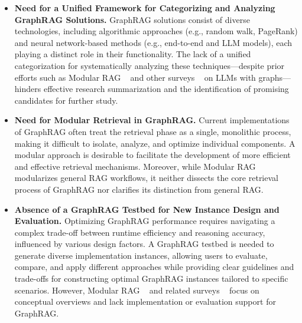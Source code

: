 \begin{itemize}  [leftmargin=12pt]
\item 
\textbf{Need for a Unified Framework for Categorizing and Analyzing GraphRAG Solutions.}
GraphRAG solutions consist of diverse technologies, including algorithmic approaches (e.g., random walk, PageRank) and neural network-based methods (e.g., end-to-end and LLM models), each playing a distinct role in their functionality. The lack of a unified categorization for systematically analyzing these techniques—despite prior efforts such as Modular RAG  ~\cite{modularRag} and other surveys ~\cite{RAGsurvey1,RAGsurvey2,RAGsurvey3,RAGsurvey4} on LLMs with graphs—hinders effective research summarization and the identification of promising candidates for further study.


\item 
\textbf{Need for Modular Retrieval in GraphRAG.}
Current implementations of GraphRAG often treat the retrieval phase as a single, monolithic process, making it difficult to isolate, analyze, and optimize individual components. A modular approach is desirable to facilitate the development of more efficient and effective retrieval mechanisms.
Moreover, while Modular RAG~\cite{modularRag} modularizes general RAG workflows, it neither dissects the core retrieval process of GraphRAG nor clarifies its distinction from general RAG.


\item 
\textbf{Absence of a GraphRAG Testbed for New Instance Design and Evaluation.}
Optimizing GraphRAG performance requires navigating a complex trade-off between runtime efficiency and reasoning accuracy, influenced by various design factors. A GraphRAG testbed is needed to generate diverse implementation instances, allowing users to evaluate, compare, and apply different approaches while providing clear guidelines and trade-offs for constructing optimal GraphRAG instances tailored to specific scenarios.
However, Modular RAG  ~\cite{modularRag} and related surveys ~\cite{RAGsurvey1,RAGsurvey2,RAGsurvey3,RAGsurvey4} focus on conceptual overviews and lack implementation or evaluation support for GraphRAG.
\end{itemize}

